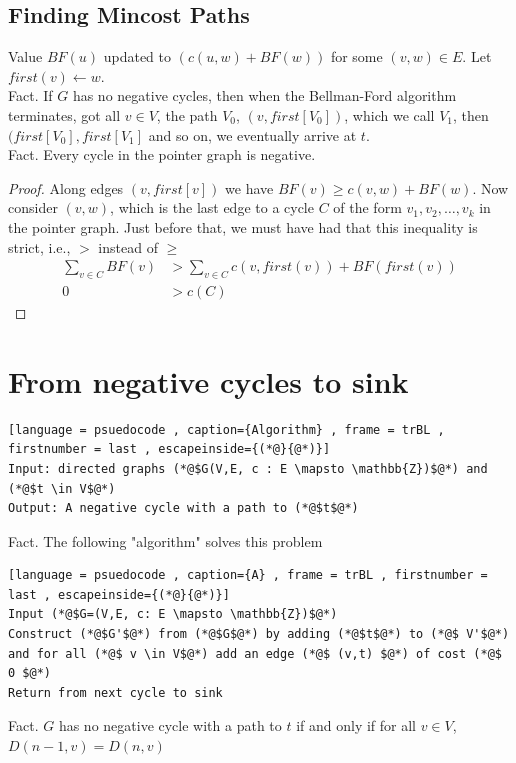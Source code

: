 \documentclass[a4paper]{article}
\theoremstyle{plain}
\theoremstyle{definition}
\theoremstyle{remark}
\begin{document}
	\subsection{Finding Mincost Paths}
	Value $BF(u)$ updated to $(c(u,w) + BF(w))$ for some $(v,w)\in E$. Let  $first(v) \leftarrow w$. \\
	Fact. If $G$ has no negative cycles, then when the Bellman-Ford algorithm terminates, got all $v \in V$, the path  $V_0$, $(v,first[V_0])$, which we call $V_1$, then $(first[V_0],first[V_1]$ and so on, we eventually arrive at $t$.\\
	Fact. Every cycle in the pointer graph is negative.
	\begin{proof}
		Along edges $(v,first[v])$ we have $BF(v) \ge c(v,w) + BF(w)$. Now consider $(v,w)$, which is the last edge to a cycle $C$ of the form $v_1,v_2,\ldots,v_k$ in the pointer graph. Just before that, we must have had that this inequality is strict, i.e., $>$ instead of $\ge $ 
		\begin{align*}
			\sum_{v \in C}^{} BF(v) &> \sum_{v \in C}^{} c(v,first(v))+BF(first(v)) \\
			0 &> c(C)
		\end{align*}
	\end{proof}
\section{From negative cycles to sink}
\begin{lstlisting}[language = psuedocode , caption={Algorithm} , frame = trBL , firstnumber = last , escapeinside={(*@}{@*)}]
Input: directed graphs (*@$G(V,E, c : E \mapsto \mathbb{Z})$@*) and (*@$t \in V$@*)
Output: A negative cycle with a path to (*@$t$@*)
\end{lstlisting}	
Fact. The following "algorithm" solves this problem 
\begin{lstlisting}[language = psuedocode , caption={A} , frame = trBL , firstnumber = last , escapeinside={(*@}{@*)}]
Input (*@$G=(V,E, c: E \mapsto \mathbb{Z})$@*)
Construct (*@$G'$@*) from (*@$G$@*) by adding (*@$t$@*) to (*@$ V'$@*) and for all (*@$ v \in V$@*) add an edge (*@$ (v,t) $@*) of cost (*@$ 0 $@*)
Return from next cycle to sink
\end{lstlisting}
Fact. $G$ has no negative cycle with a path to $t$ if and only if for all $v \in V$, $D(n-1,v) = D(n,v)$ 
\end{document}
